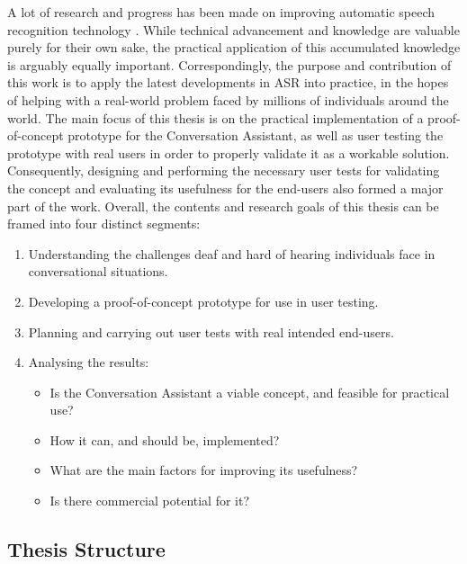 \documentclass[english, 12pt, a4paper, pdftex, elec, utf8]{aaltothesis}
\begin{document}
A lot of research and progress has been made on improving automatic speech recognition technology \cite{yu2014automatic, gales2008application, keronen2014approaching, hinton2012deep, pylkkonen2013towards, xiong2016achieving, enarvi2017automatic}. While technical advancement and knowledge are valuable purely for their own sake, the practical application of this accumulated knowledge is arguably equally important. Correspondingly, the purpose and contribution of this work is to apply the latest developments in ASR into practice, in the hopes of helping with a real-world problem faced by millions of individuals around the world. The main focus of this thesis is on the practical implementation of a proof-of-concept prototype for the Conversation Assistant, as well as user testing the prototype with real users in order to properly validate it as a workable solution. Consequently, designing and performing the necessary user tests for validating the concept and evaluating its usefulness for the end-users also formed a major part of the work. Overall, the contents and research goals of this thesis can be framed into four distinct segments:
\vspace{2mm}
\begin{enumerate}[itemsep=2mm]
	\item Understanding the challenges deaf and hard of hearing individuals face in conversational situations.
	\item Developing a proof-of-concept prototype for use in user testing.
	\item Planning and carrying out user tests with real intended end-users.
	\item Analysing the results:
	\begin{itemize}[align=left,  leftmargin=0.52cm, labelsep=-0.18cm, itemsep=2mm]
		\item Is the Conversation Assistant a viable concept, and feasible for practical use?
		\item How it can, and should be, implemented?
		\item What are the main factors for improving its usefulness? 
		\item Is there commercial potential for it? \\
	\end{itemize}
\end{enumerate}

\subsection{Thesis Structure}
\end{document}
